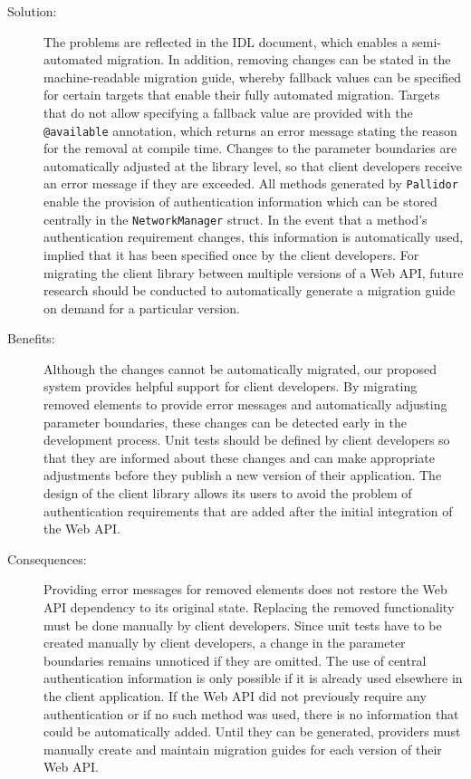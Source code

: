 \begin{description}
\begin{itemize}
	\end{itemize}
	\item[Solution:] The problems are reflected in the IDL document, which enables a semi-automated migration. In addition, removing changes can be stated in the machine-readable migration guide, whereby fallback values can be specified for certain targets that enable their fully automated migration. Targets that do not allow specifying a fallback value are provided with the \texttt{@available} annotation, which returns an error message stating the reason for the removal at compile time. Changes to the parameter boundaries are automatically adjusted at the library level, so that client developers receive an error message if they are exceeded. All methods generated by \texttt{Pallidor} enable the provision of authentication information which can be stored centrally in the \texttt{NetworkManager} struct. In the event that a method's authentication requirement changes, this information is automatically used, implied that it has been specified once by the client developers. For migrating the client library between multiple versions of a Web API, future research should be conducted to automatically generate a migration guide on demand for a particular version. 
	\item[Benefits:] Although the changes cannot be automatically migrated, our proposed system provides helpful support for client developers. By migrating removed elements to provide error messages and automatically adjusting parameter boundaries, these changes can be detected early in the development process. Unit tests should be defined by client developers so that they are informed about these changes and can make appropriate adjustments before they publish a new version of their application. The design of the client library allows its users to avoid the problem of authentication requirements that are added after the initial integration of the Web API. 
	\item[Consequences:] Providing error messages for removed elements does not restore the Web API dependency to its original state. Replacing the removed functionality must be done manually by client developers. Since unit tests have to be created manually by client developers, a change in the parameter boundaries remains unnoticed if they are omitted. The use of central authentication information is only possible if it is already used elsewhere in the client application. If the Web API did not previously require any authentication or if no such method was used, there is no information that could be automatically added. Until they can be generated, providers must manually create and maintain migration guides for each version of their Web API.

\end{description}
